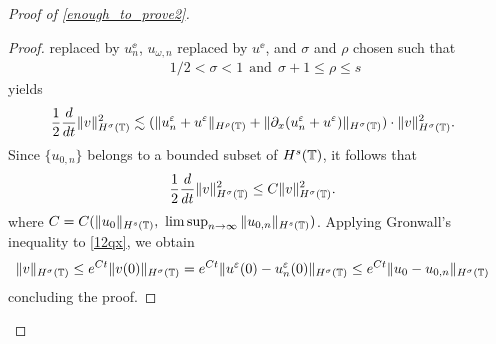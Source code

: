 \begin{proof}[Proof of \eqref{enough_to_prove2}]
\begin{proof}
replaced by $u^\ee_n$, $u_{\omega,n}$ replaced by $u^\ee$, and $\sigma$ and 
$\rho$ chosen such that
%
%
\begin{equation}
\label{size_of_sigma'}
\begin{split}
	& 1/2 < \sigma < 1 \ \ \text{and} \ \  \sigma + 1 \le \rho \le s
\end{split}
\end{equation}
%
%
yields
%
%
\begin{equation*}
\begin{split}
\frac{1}{2}\frac{d}{dt} \|v\|_{H^\sigma(\mathbb{T})}^2
& \lesssim
(\|u^{\varepsilon}_n + u^\varepsilon \|_{H^{\rho}(\mathbb{T})} +
\|\partial_x(u^{\varepsilon}_n + u^\varepsilon) \|_{H^\sigma(\mathbb{T})})
\cdot \|v\|_{H^\sigma(\mathbb{T})}^2.
\end{split}
\end{equation*}
%
%
Since $\{u_{0,n}\}$ belongs to a bounded subset of $H^s(\mathbb{T})$, it follows that %
%
\begin{equation}
\begin{split}
\label{12qx}
\frac{1}{2}\frac{d}{dt} \|v\|_{H^{\sigma}(\mathbb{T})}^2
& \le
C \|v\|_{H^{\sigma}(\mathbb{T})}^2.
\end{split}
\end{equation}
%
%
where $C = C(\|u_0\|_{H^s(\mathbb{T})}, \ \limsup_{n \to \infty} 
\|u_{0,n}\|_{H^s(\mathbb{T})})$. 
Applying Gronwall's inequality to \eqref{12qx}, we obtain
%
%
\begin{equation*}
\begin{split}
\|v\|_{H^{\sigma}(\mathbb{T})}
& \le e^{C t}\|v(0)\|_{H^{\sigma}(\mathbb{T})}
= e^{C t}\|u^\varepsilon(0) - u^\varepsilon_n(0) \|_{H^{\sigma}(\mathbb{T})} \le e^{C t} \|u_0 - 
u_{0,n}\|_{H^\sigma(\mathbb{T})}
\end{split}
\end{equation*}
%
%
concluding the proof. 
\end{proof}
%
%
%


\end{proof}

